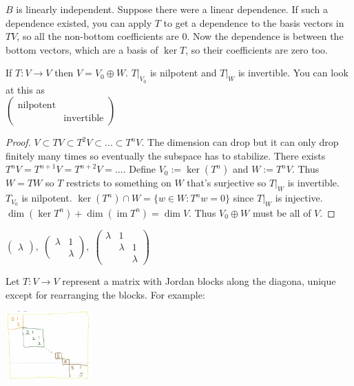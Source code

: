 \documentclass{article}
\newcommand{\ra}[1][]{\xrightarrow{#1}}
\DeclareMathOperator{\im}{im}
\begin{document}
\begin{proposition}
$B$ is linearly independent. Suppose there were a linear dependence. If such a dependence existed, you can apply $T$ to get a dependence to the basis vectors in $TV$, so all the non-bottom coefficients are 0. Now the dependence is between the bottom vectors, which are a basis of $\ker T$, so their coefficients are zero too.
\end{proposition}
\begin{lemma}
If $T:V\ra V$ then $V=V_0\oplus W$. $T|_{V_0}$ is nilpotent and $T|_W$ is invertible. You can look at this as\\ $\begin{pmatrix}
\textrm{nilpotent}&\\
&\textrm{invertible}
\end{pmatrix}$
\end{lemma}
\begin{proof}
$V\subset TV\subset T^2V\subset...\subset T^nV$. The dimension can drop but it can only drop finitely many times so eventually the subspace has to stabilize. There exists $T^nV=T^{n+1}V=T^{n+2}V=...$. Define $V_0:=\ker(T^n)$ and $W:=T^n V$. Thus $W=TW$ so $T$ restricts to something on $W$ that's surjective so $T|_W$ is invertible. $T_{V_0}$ is nilpotent. $\ker(T^n)\cap W=\{w\in W:T^nw=0\}$ since $T|_W$ is injective. $\dim(\ker T^n)+\dim(\im T^n)=\dim V$. Thus $V_0\oplus W$ must be all of $V$.
\end{proof}
\begin{definition}
$\begin{pmatrix}\lambda\end{pmatrix},\;\begin{pmatrix}\lambda&1\\&\lambda\end{pmatrix},\;\begin{pmatrix}\lambda&1&\\&\lambda&1\\&&\lambda\end{pmatrix}$
\end{definition}
\begin{theorem}
Let $T:V\ra V$ represent a matrix with Jordan blocks along the diagona, unique except for rearranging the blocks. For example:
\begin{center}
   \includegraphics[width=0.25\textwidth]{Image 3 9232020.PNG}
\end{center}
\end{theorem}
\end{document}
